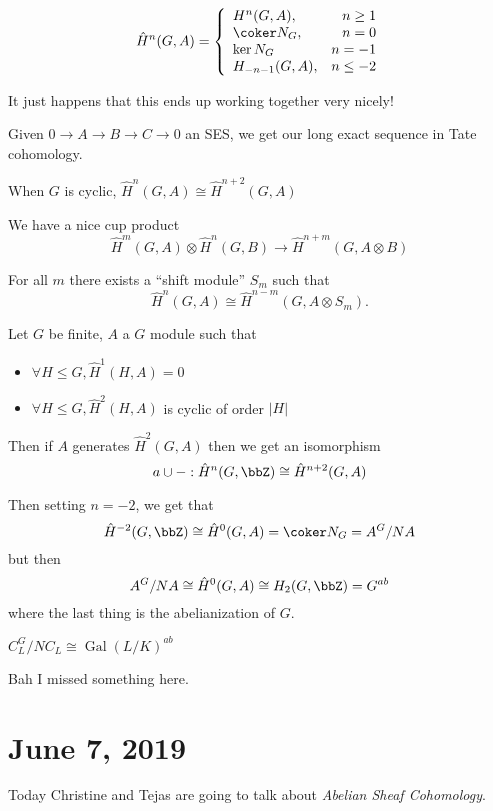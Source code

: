 \documentclass[12pt]{article}
\begin{document}
\[\hat H^n(G,A)=\left\{\begin{array}{lr} H^n(G,A),& n\ge 1\\
	\coker N_G, & n=0\\
	\ker N_G & n=-1\\
H_{-n-1}(G,A),& n\le -2\end{array}\right.\]

It just happens that this ends up working together very nicely!

\begin{prop}
	Given $0\to A\to B\to C\to 0$ an SES, we get our long exact sequence in Tate cohomology.
\end{prop}
\begin{prop}
	When $G$ is cyclic, $\hat H^n(G,A)\cong\hat H^{n+2}(G,A)$
\end{prop}
\begin{prop}
	We have a nice cup product
	\[\hat H^m(G,A)\otimes \hat H^n(G,B)\to \hat H^{n+m}(G,A\otimes B)\]
\end{prop}
\begin{prop}
	For all $m$ there exists a ``shift module'' $S_m$ such that 
	\[\hat H^n(G,A)\cong\hat H^{n-m}(G,A\otimes S_m).\]
\end{prop}
\begin{thm}[Tate]
	Let $G$ be finite, $A$ a $G$ module such that 
	\begin{itemize}
		\item $\forall H\le G,\hat H^1(H,A)=0$
		\item $\forall H\le G, \hat H^2(H,A)$ is cyclic of order $|H|$
	\end{itemize}
	Then if $A$ generates $\hat H^2(G,A)$ then we get an isomorphism
	\[a\cup -:\hat H^n(G,\bbZ)\cong \hat H^{n+2}(G,A)\]
\end{thm}
Then setting $n=-2$, we get that 
\[\hat H^{-2}(G,\bbZ)\cong\hat H^0(G,A)=\coker N_G=A^G/NA\]
but then 
\[A^G/NA\cong \hat H^0(G,A)\cong H_2(G,\bbZ)=G^{ab}\]
where the last thing is the abelianization of $G$.

$C_L^G/NC_L\cong\operatorname{Gal}(L/K)^{ab}$ 

Bah I missed something here.

\section{June 7, 2019}
Today Christine and Tejas are going to talk about \textit{Abelian Sheaf Cohomology}.
\end{document}
